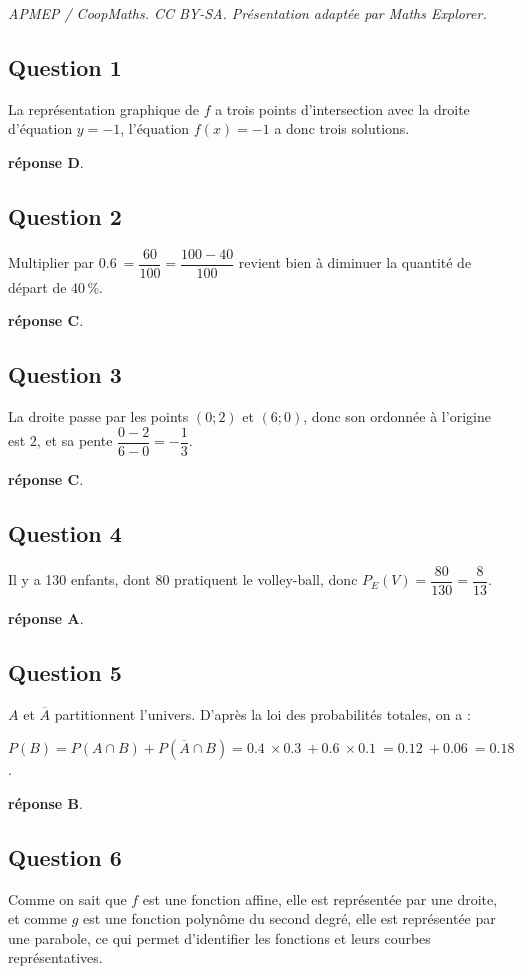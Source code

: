 \documentclass[10pt]{article}
\providecommand{\np}[2][]{{#2~#1}}
\begin{document}
\noindent\textit{APMEP / CoopMaths. CC BY-SA. Présentation adaptée par Maths Explorer.}\par\medskip
\subsection*{Question 1}
	La représentation graphique de $f$ a trois points d'intersection avec la droite d'équation {$y=-1$}, l'équation {$f(x)=-1$} a donc trois solutions.

	\textbf{réponse D}.

\subsection*{Question 2}

	Multiplier par {$\np{0.6}=\dfrac{60}{100}=\dfrac{100-40}{100}$} revient bien à diminuer la quantité de départ de 40\,\%.

	\textbf{réponse C}.

\subsection*{Question 3}

	La droite passe par les points {$(0;2)$} et {$(6;0)$}, donc son ordonnée à l'origine est $2$, et sa pente {$\dfrac{0-2}{6-0}=-\dfrac13$}.

	\textbf{réponse C}.

\subsection*{Question 4}

	Il y a 130 enfants, dont 80 pratiquent le volley-ball, donc {$P_E(V)=\dfrac{80}{130}=\dfrac{8}{13}$}.

	\textbf{réponse A}.

\subsection*{Question 5}

	$A$ et $\overline{A}$ partitionnent l'univers. D'après la loi des probabilités totales, on a :

	{$P(B)=P(A\cap B)+P(\overline{A}\cap B)=\np{0.4}\times\np{0.3}+\np{0.6}\times\np{0.1}=\np{0.12}+\np{0.06}=\np{0.18}$}.

	\textbf{réponse B}.

\subsection*{Question 6}
	Comme on sait que $f$ est une fonction affine, elle est représentée par une droite, et comme $g$ est une fonction polynôme du second degré, elle est représentée par une parabole, ce qui permet d'identifier les fonctions et leurs courbes représentatives.
\end{document}
